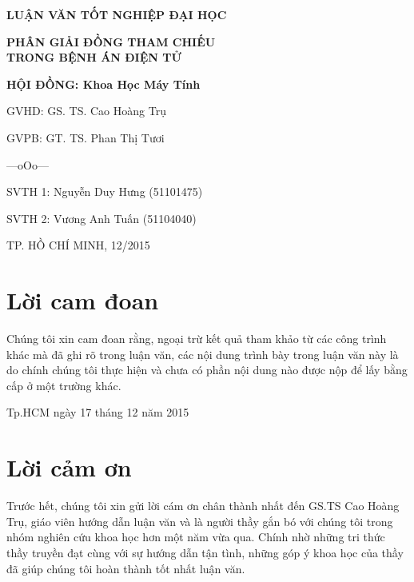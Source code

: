 \documentclass[12pt,a4paper,twoside]{report}
\begin{document}
\begin{titlepage}
\vspace{1.2cm}

\large\textbf{LUẬN VĂN TỐT NGHIỆP ĐẠI HỌC}

\vspace{0.8cm}

\LARGE\textbf{PHÂN GIẢI ĐỒNG THAM CHIẾU\\TRONG BỆNH ÁN ĐIỆN TỬ}

\vspace{1.8cm}

\begin{minipage}{0.35\textwidth}
\phantom{ab}
\end{minipage}
\begin{minipage}{0.65\textwidth}
\large\bfseries
HỘI ĐỒNG: Khoa Học Máy Tính\par
GVHD: GS. TS. Cao Hoàng Trụ\par
GVPB: GT. TS. Phan Thị Tươi\par
\centering---oOo---\par
\raggedright
SVTH 1: Nguyễn Duy Hưng (51101475)\par
SVTH 2: Vương Anh Tuấn (51104040)\par
\end{minipage}

\vspace{3cm}
\large TP. HỒ CHÍ MINH, 12/2015
\end{titlepage}

\pagestyle{empty}
\cleardoublepage

\pagestyle{fancy}
\setcounter{page}{1}

\chapter*{Lời cam đoan}
Chúng tôi xin cam đoan rằng, ngoại trừ kết quả tham khảo từ các công trình khác mà đã ghi rõ trong luận văn, các nội dung trình bày trong luận văn này là do chính chúng tôi thực hiện và chưa có phần nội dung nào được nộp để lấy bằng cấp ở một trường khác.

\begin{flushright}
Tp.HCM ngày 17 tháng 12 năm 2015
\end{flushright}

\chapter*{Lời cảm ơn}
Trước hết, chúng tôi xin gửi lời cám ơn chân thành nhất đến GS.TS Cao Hoàng Trụ, giáo viên hướng dẫn luận văn và là người thầy gắn bó với chúng tôi trong nhóm nghiên cứu khoa học hơn một năm vừa qua. Chính nhờ những tri thức thầy truyền đạt cùng với sự hướng dẫn tận tình, những góp ý khoa học của thầy đã giúp chúng tôi hoàn thành tốt nhất luận văn.
\end{document}
